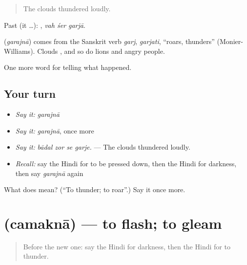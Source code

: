 \begin{quote}
The clouds thundered loudly.
\end{quote}

Past (it …):   , \emph{vah śer garjā}.

\begin{cousinweb}
\textbf{} (\emph{garajnā}) comes from the Sanskrit verb \emph{garj}, \emph{garjati}, \textquotedblleft{}roars, thunders\textquotedblright{} (Monier-Williams). Clouds \textbf{ }, and so do lions and angry people.
\end{cousinweb}

\begin{grammarlens}[title={What you've built}]
One more word for telling what happened.
\end{grammarlens}

\subsection*{Your turn}
\begin{itemize}
\raggedright
  \item \emph{Say it:} \emph{garajnā}
  \item \emph{Say it:} \emph{garajnā}, once more
  \item \emph{Say it:} \emph{bādal zor se garje.} — The clouds thundered loudly.
  \item \emph{Recall:} say the Hindi for to be pressed down, then the Hindi for darkness, then say \emph{garajnā} again
\end{itemize}

\begin{tcolorbox}[breakable,colback=teal!4,colframe=teal!35!black,title={Before you move on}]
What does  mean? (\textquotedblleft{}To thunder; to roar\textquotedblright{}.) Say it once more.
\end{tcolorbox}
\section[\texorpdfstring{\hi{चमकना} (camaknā)}{चमकना (camaknā)}]{ (camaknā) — to flash; to gleam}

\label{lesson:HI-C304-camakna}



\begin{quote}
Before the new one: say the Hindi for darkness, then the Hindi for to thunder.
\end{quote}

